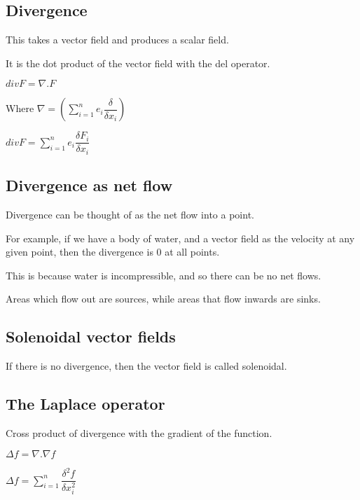 
\subsection{Divergence}

This takes a vector field and produces a scalar field.

It is the dot product of the vector field with the del operator.

\(div F = \nabla . F\)

Where \(\nabla =(\sum_{i=1}^n e_i\dfrac{\delta }{\delta x_i})\)

\(div F = \sum_{i=1}^n e_i\dfrac{\delta F_i}{\delta x_i}\)

\subsection{Divergence as net flow}

Divergence can be thought of as the net flow into a point.

For example, if we have a body of water, and a vector field as the velocity at any given point, then the divergence is \(0\) at all points.

This is because water is incompressible, and so there can be no net flows.

Areas which flow out are sources, while areas that flow inwards are sinks.

\subsection{Solenoidal vector fields}

If there is no divergence, then the vector field is called solenoidal.

\subsection{The Laplace operator}

Cross product of divergence with the gradient of the function.

\(\Delta f= \nabla . \nabla f\)

\(\Delta f= \sum_{i=1}^n \dfrac{\delta^2 f}{\delta x^2_i}\)

